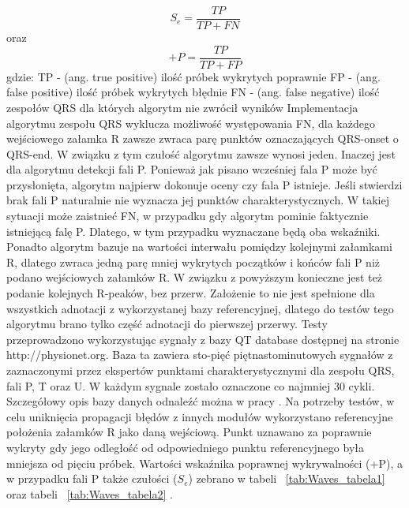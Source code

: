 \begin{equation} \label{eq:Waves_Se}
S_e=\frac{TP}{TP+FN}
\end{equation}
oraz
\begin{equation} \label{eq:Waves_plusP}
+P=\frac{TP}{TP+FP}
\end{equation}
gdzie: \newline
TP - (ang. true positive) ilość próbek wykrytych poprawnie \newline
FP - (ang. false positive) ilość próbek wykrytych błędnie \newline
FN - (ang. false negative) ilość zespołów QRS dla których algorytm nie zwrócił wyników \newline
Implementacja algorytmu zespołu QRS wyklucza możliwość występowania FN, dla każdego wejściowego załamka R zawsze zwraca parę punktów oznaczających QRS-onset o QRS-end. W związku z tym czułość algorytmu zawsze wynosi jeden. Inaczej jest dla algorytmu detekcji fali P. Ponieważ jak pisano wcześniej fala P może być przysłonięta, algorytm najpierw dokonuje oceny czy fala P istnieje. Jeśli stwierdzi brak fali P naturalnie nie wyznacza jej punktów charakterystycznych. W takiej sytuacji może zaistnieć FN, w przypadku gdy algorytm pominie  faktycznie istniejącą falę P. Dlatego, w tym przypadku wyznaczane będą oba wskaźniki. Ponadto algorytm bazuje na wartości interwału pomiędzy kolejnymi załamkami R, dlatego zwraca jedną parę mniej wykrytych początków i końców fali P niż podano wejściowych załamków R. W związku z powyższym konieczne jest też podanie kolejnych R-peaków, bez przerw. Założenie to nie jest spełnione dla wszystkich adnotacji z wykorzystanej bazy referencyjnej, dlatego do testów tego algorytmu brano tylko część adnotacji do pierwszej przerwy.   
Testy przeprowadzono wykorzystując sygnały z bazy QT database dostępnej na stronie http://physionet.org. Baza ta zawiera sto-pięć piętnastominutowych sygnałów z zaznaczonymi przez ekspertów punktami charakterystycznymi dla zespołu QRS, fali P, T oraz U. W każdym sygnale zostało oznaczone co najmniej 30 cykli. Szczegółowy opis bazy danych odnaleźć można w pracy \cite{Waves_aDfEoAfMoQaOWIitE}. Na potrzeby testów, w celu uniknięcia propagacji błędów z innych modułów wykorzystano referencyjne położenia załamków R jako daną wejściową. Punkt uznawano za poprawnie wykryty gdy jego odległość od odpowiedniego punktu referencyjnego była mniejsza od pięciu próbek. Wartości wskaźnika poprawnej wykrywalności (+P), a w przypadku fali P także czułości ($S_e$) zebrano w tabeli ~\ref{tab:Waves_tabela1} oraz tabeli ~\ref{tab:Waves_tabela2} .

